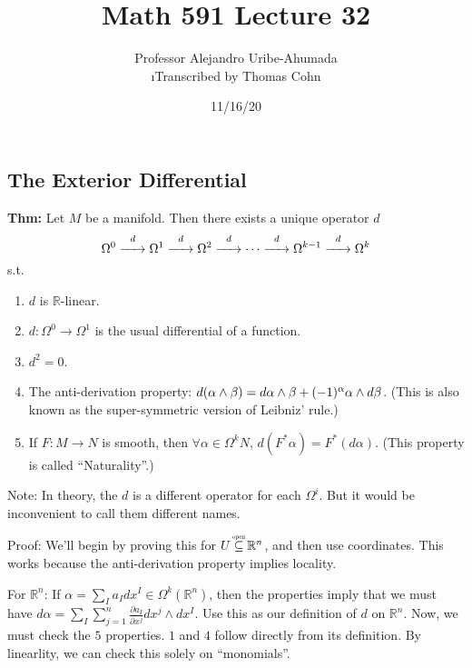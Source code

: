 \documentclass[10pt,letterpaper]{article}
\author{Professor Alejandro Uribe-Ahumada\\ \small\i{Transcribed by Thomas Cohn}}
\title{Math 591 Lecture 32}
\date{11/16/20} %
\newcommand{\n}{\hfill\break}
\newcommand{\up}{\vspace{-\baselineskip}}
\newcommand{\hangblock}[2]{\par\noindent\settowidth{\hangindent}{\textbf{#1: }}\textbf{#1: }\nolinebreak#2}
\newcommand{\thm}[1]{\hangblock{Thm}{#1}}
\newcommand{\ptxt}[1]{\textrm{\textnormal{#1}}}
\newcommand{\reals}{\mathbb{R}}
\newcommand{\R}{\reals}
\newcommand{\osubseteq}{\overset{\mathclap{\scalebox{0.5}{\ptxt{open}}}}{\subseteq}}
\let\deg\relax
\DeclareMathOperator{\deg}{deg}
\newcommand{\pd}[2]{\frac{\partial{}#1}{\partial{}#2}}
\newcommand{\st}{s.t.}
\begin{document}
\maketitle
\setlength\RaggedRightParindent{\parindent}
\RaggedRight

\subsection*{The Exterior Differential}

\thm{
	Let $M$ be a manifold. Then there exists a unique operator $d$
	\[
		\Omega^{0}\overset{d}{\xrightarrow{\hspace{0.5cm}}}\Omega^{1}\overset{d}{\xrightarrow{\hspace{0.5cm}}}\Omega^{2}\overset{d}{\xrightarrow{\hspace{0.5cm}}}\cdots\overset{d}{\xrightarrow{\hspace{0.5cm}}}\Omega^{k-1}\overset{d}{\xrightarrow{\hspace{0.5cm}}}\Omega^{k}
	\]
	\st{}
	\begin{enumerate}[itemsep=0pt, topsep=0pt, leftmargin=4\parindent, label=(\arabic*)]
		\item $d$ is $\R$-linear.
		\item $d:\Omega^{0}\to\Omega^{1}$ is the usual differential of a function.
		\item $d^{2}=0$.
		\item The anti-derivation property: $d(\alpha\wedge\beta)=d\alpha\wedge\beta+(-1)^{\deg\alpha}\alpha\wedge{}d\beta$. (This is also known as the super-symmetric version of Leibniz' rule.)
		\item If $F:M\to{}N$ is smooth, then $\forall\alpha\in\Omega^{k}N$, $d(F^{*}\alpha)=F^{*}(d\alpha)$. (This property is called ``Naturality''.)
	\end{enumerate}\up\n
}

\par\noindent
Note: In theory, the $d$ is a different operator for each $\Omega^{i}$. But it would be inconvenient to call them different names.\n

\par\noindent
Proof: We'll begin by proving this for $U\osubseteq\R^{n}$, and then use coordinates. This works because the anti-derivation property implies locality.\n

\par\noindent
For $\R^{n}$: If $\displaystyle\alpha=\sum_{I}a_{I}dx^{I}\in\Omega^{k}(\R^{n})$, then the properties imply that we must have $\displaystyle{}d\alpha=\sum_{I}\sum_{j=1}^{n}\pd{a_{I}}{x^{j}}dx^{j}\wedge{}dx^{I}$.\n
Use this as our definition of $d$ on $\R^{n}$. Now, we must check the $5$ properties. $1$ and $4$ follow directly from its definition. By linearlity, we can check this solely on ``monomials''.\n
\end{document}
